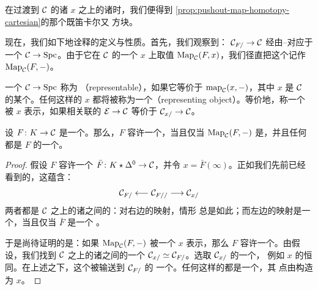\begin{remark}\label{rem:fibre-pushout-square}
在过渡到 $\mathcal{C}$ 的诸\trObject{} $x$ 之上的诸\trFibre{}时，我们便得到%
\cref{prop:pushout-map-homotopy-cartesian}的那个既笛卡尔又\trHomotopyCartesian{}%
方块。
\end{remark}

现在，我们如下地诠释\trColimit{}的定义与性质。首先，我们观察到：\trLeftFibration{}%
$\mathcal{C}_{F/} \to \mathcal{C}$ 经由\trStraightening{}--\trUnstraightening{}\trEquivalence{}对应于
一个\trFunctor{} $\mathcal{C} \to \mathrm{Spc}$。由于它在 $\mathcal{C}$ 的一个\trObject{} $x$ 上取值
$\mathrm{Map}_{\mathcal{C}}(F, x)$，我们径直把这个\trFunctor{}记作
$\mathrm{Map}_{\mathcal{C}}(F, -)$。

\begin{definition}\label{def:representable}
一个\trFunctor{} $\mathcal{C} \to \mathrm{Spc}$ 称为\emph{\trRepresentable{}}%
（representable），如果它等价于\trFunctor{} $\mathrm{map}_{\mathcal{C}}(x, -)$，其中 $x$ 是
$\mathcal{C}$ 的某个\trObject{}。任何这样的 $x$ 都将被称为一个\emph{\trRepresentingObject{}}（representing
object）。等价地，称一个\trFunctor{}被 $x$ 表示，如果相关联的\trLeftFibration{}%
$\mathcal{E} \to \mathcal{C}$ 等价于\trLeftFibration{} $\mathcal{C}_{x/} \to \mathcal{C}$。
\end{definition}

\begin{proposition}\label{prop:representable-colimit}
设 $F\colon K \to \mathcal{C}$ 是一个\trFunctor{}。那么，$F$ 容许一个\trColimit{}，当且仅当%
\trFunctor{} $\mathrm{Map}_{\mathcal{C}}(F, -)$ 是\trRepresentable{}，并且任何\trRepresentingObject{}都是
$F$ 的一个\trColimit{}。
\end{proposition}

\begin{proof}
假设 $F$ 容许一个\trColimit{}\trCone{} $\bar{F}\colon K \star \Delta^0 \to \mathcal{C}$，并令
$x = \bar{F}(\infty)$。正如我们先前已经看到的，这蕴含：\trFunctor{}%
\[
\mathcal{C}_{F/} \longleftarrow \mathcal{C}_{F//} \longrightarrow \mathcal{C}_{x/}
\]
两者都是 $\mathcal{C}$ 之上的诸\trLeftFibration{}之间的\trEquivalence{}：对右边的映射，情形
总是如此；而左边的映射是一个\trEquivalence{}，当且仅当 $\bar{F}$ 是一个%
\trColimit{}\trCone{}。

于是尚待证明的是：如果 $\mathrm{Map}_{\mathcal{C}}(F, -)$ 被一个\trObject{} $x$ 表示，那么
$F$ 容许一个\trColimit{}。由假设，我们找到 $\mathcal{C}$ 之上的诸\trLeftFibration{}之间的一个%
\trEquivalence{} $\mathcal{C}_{x/} \simeq \mathcal{C}_{F/}$。选取 $\mathcal{C}_{x/}$ 的一个\trInitialObject{}，
例如 $x$ 的恒同。在上述\trEquivalence{}之下，这个\trObject{}被输送到 $\mathcal{C}_{F/}$ 的
一个\trInitialObject{}。任何这样的\trObject{}都是一个\trColimit{}\trCone{}，其\trColimit{}%
点由构造为 $x$。
\end{proof}

